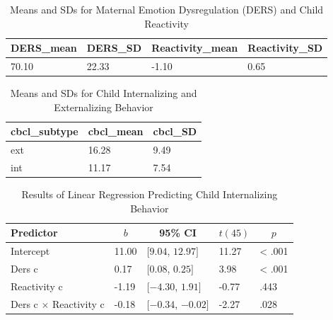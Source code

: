\documentclass[man]{apa6}
\begin{document}
\begin{table}[tbp]
\begin{center}
\begin{threeparttable}
\caption{\label{tab:descriptives ders and reactivity}Means and SDs for Maternal Emotion Dysregulation (DERS) and Child Reactivity}
\begin{tabular}{llll}
\toprule
DERS\_mean & \multicolumn{1}{c}{DERS\_SD} & \multicolumn{1}{c}{Reactivity\_mean} & \multicolumn{1}{c}{Reactivity\_SD}\\
\midrule
70.10 & 22.33 & -1.10 & 0.65\\
\bottomrule
\end{tabular}
\end{threeparttable}
\end{center}
\end{table}

\begin{table}[tbp]
\begin{center}
\begin{threeparttable}
\caption{\label{tab:descriptives cbcl}Means and SDs for Child Internalizing and Externalizing Behavior}
\begin{tabular}{lll}
\toprule
cbcl\_subtype & \multicolumn{1}{c}{cbcl\_mean} & \multicolumn{1}{c}{cbcl\_SD}\\
\midrule
ext & 16.28 & 9.49\\
int & 11.17 & 7.54\\
\bottomrule
\end{tabular}
\end{threeparttable}
\end{center}
\end{table}

\begin{table}[tbp]
\begin{center}
\begin{threeparttable}
\caption{\label{tab:linear regression internalizing}Results of Linear Regression Predicting Child Internalizing Behavior}
\begin{tabular}{lllll}
\toprule
Predictor & \multicolumn{1}{c}{$b$} & \multicolumn{1}{c}{95\% CI} & \multicolumn{1}{c}{$t(45)$} & \multicolumn{1}{c}{$p$}\\
\midrule
Intercept & 11.00 & $[9.04$, $12.97]$ & 11.27 & < .001\\
Ders c & 0.17 & $[0.08$, $0.25]$ & 3.98 & < .001\\
Reactivity c & -1.19 & $[-4.30$, $1.91]$ & -0.77 & .443\\
Ders c $\times$ Reactivity c & -0.18 & $[-0.34$, $-0.02]$ & -2.27 & .028\\
\bottomrule
\end{tabular}
\end{threeparttable}
\end{center}
\end{table}
\end{document}
